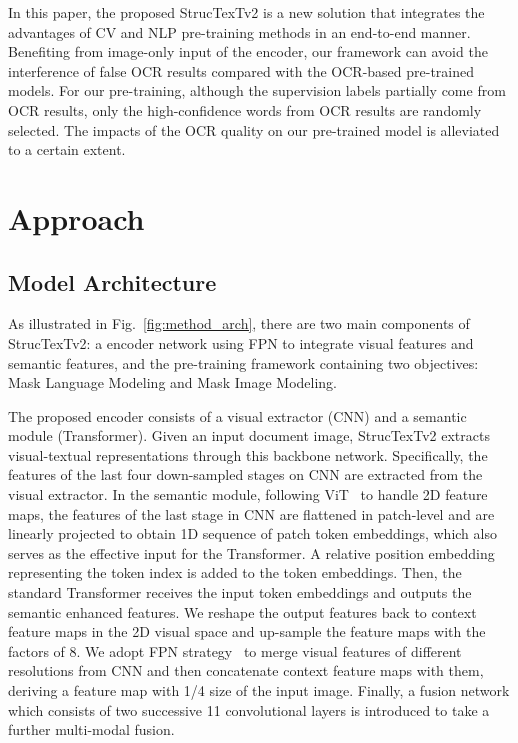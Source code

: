 \documentclass{article} \usepackage{iclr2023_conference,times}
\begin{document}
In this paper, the proposed StrucTexTv2 is a new solution that integrates the advantages of CV and NLP pre-training methods in an end-to-end manner. Benefiting from image-only input of the encoder, our framework can avoid the interference of false OCR results compared with the OCR-based pre-trained models. For our pre-training, although the supervision labels partially come from OCR results, only the high-confidence words from OCR results are randomly selected. The impacts of the OCR quality on our pre-trained model is alleviated to a certain extent.


\section{Approach}


\subsection{Model Architecture}
As illustrated in Fig.~\ref{fig:method_arch}, there are two main components of StrucTexTv2: a encoder network using FPN to integrate visual features and semantic features, and the pre-training framework containing two objectives: Mask Language Modeling and Mask Image Modeling.


The proposed encoder consists of a visual extractor (CNN) and a semantic module (Transformer). Given an input document image, StrucTexTv2 extracts visual-textual representations through this backbone network. Specifically, the features of the last four down-sampled stages on CNN are extracted from the visual extractor. In the semantic module, following ViT~\cite{DBLP:journals/corr/abs-2010-11929} to handle 2D feature maps, the features of the last stage in CNN are flattened in patch-level and are linearly projected to obtain 1D sequence of patch token embeddings, which also serves as the effective input for the Transformer. A relative position embedding representing the token index is added to the token embeddings. 
Then, the standard Transformer receives the input token embeddings and outputs the semantic enhanced features. We reshape the output features back to context feature maps in the 2D visual space and up-sample the feature maps with the factors of 8. We adopt FPN strategy~\cite{lin2017feature} to merge visual features of different resolutions from CNN and then concatenate context feature maps with them, deriving a feature map with 1/4 size of the input image. Finally, a fusion network which consists of two successive 11 convolutional layers is introduced to take a further multi-modal fusion.
\end{document}
